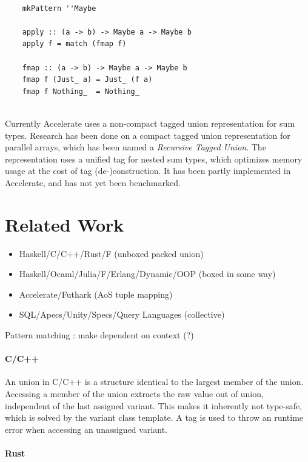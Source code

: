 \documentclass{article}
\begin{document}
\begin{verbatim}
    
    mkPattern ''Maybe

    apply :: (a -> b) -> Maybe a -> Maybe b
    apply f = match (fmap f)

    fmap :: (a -> b) -> Maybe a -> Maybe b
    fmap f (Just_ a) = Just_ (f a)
    fmap f Nothing_  = Nothing_
    
\end{verbatim}

Currently Accelerate uses a non-compact tagged union representation for sum types.
Research has been done on a compact tagged union representation for parallel arrays, which has been named a {\it Recursive Tagged Union}\cite{accelerate-sum-types}.
The representation uses a unified tag for nested sum types, which optimizes memory usage at the cost of tag (de-)construction.  
It has been partly implemented in Accelerate, and has not yet been benchmarked.

\newpage

\section{Related Work}

\begin{itemize}
    \item Haskell/C/C++/Rust/F (unboxed packed union)
    \item Haskell/Ocaml/Julia/F/Erlang/Dynamic/OOP (boxed in some way)
    \item Accelerate/Futhark (AoS tuple mapping)
    \item SQL/Apecs/Unity/Specs/Query Languages (collective)
\end{itemize}


Pattern matching : make dependent on context (?)

\paragraph{C/C++}

An union in C/C++ is a structure identical to the largest member of the union.
Accessing a member of the union extracts the raw value out of union, independent of the last assigned variant.
This makes it inherently not type-safe, which is solved by the variant class template.
A tag is used to throw an runtime error when accessing an unassigned variant.

\paragraph{Rust}
\end{document}
